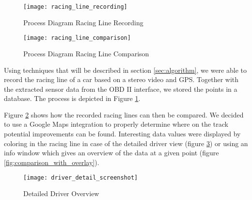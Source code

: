 \begin{figure}[!ht]
		\centering
		\texttt{[image: racing\_line\_recording]}
		\caption{Process Diagram Racing Line Recording}
		\label{fig:racing_line_recording}
\end{figure}
\begin{figure}[!ht]
	\centering
	\texttt{[image: racing\_line\_comparison]}
	\caption{Process Diagram Racing Line Comparison}
	\label{fig:racing_line_comparison}
\end{figure}

Using techniques that will be described in section \ref{sec:algorithm}, we were able to record the racing line of a car based on a stereo video and GPS. Together with the extracted sensor data from the OBD II interface, we stored the points in a database. The process is depicted in Figure \ref{fig:racing_line_recording}.

Figure \ref{fig:racing_line_comparison} shows how the recorded racing lines can then be compared. We decided to use a Google Maps integration to properly determine where on the track potential improvements can be found. Interesting data values were displayed by coloring in the racing line in case of the detailed driver view (figure \ref{fig:driver_detail}) or using an info window which gives an overview of the data at a given point (figure \ref{fig:comparison_with_overlay}).

\begin{figure}[!ht]
	\texttt{[image: driver\_detail\_screenshot]}
	\caption{Detailed Driver Overview}
	\label{fig:driver_detail}
\end{figure}

\clearpage
